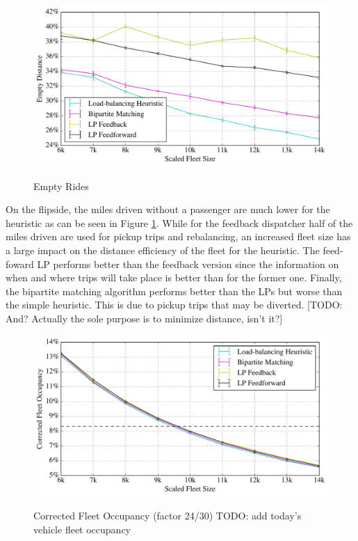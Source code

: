 \begin{figure}
\includegraphics[width=1.0\textwidth]{figures/empty_rides.pdf}
\label{fig:empty_rides}
\caption{Empty Rides}
\end{figure}

On the flipside, the miles driven without a passenger are much lower for the heuristic as can be seen in Figure \ref{fig:empty_rides}. While for the feedback dispatcher half of the miles driven are used for pickup trips and rebalancing, an increased fleet size has a large impact on the distance efficiency of the fleet for the heuristic. The feed-foward LP performs better than the feedback version since the information on when and where trips will take place is better than for the former one. Finally, the bipartite matching algorithm performs better than the LPs but worse than the simple heuristic. This is due to pickup trips that may be diverted. [TODO: And? Actually the sole purpose is to minimize distance, isn't it?]

\begin{figure}
\includegraphics[width=1.0\textwidth]{figures/occupancy.pdf}
\label{fig:occupancy}
\caption{Corrected Fleet Occupancy (factor 24/30) TODO: add today's vehicle fleet occupancy}
\end{figure}

